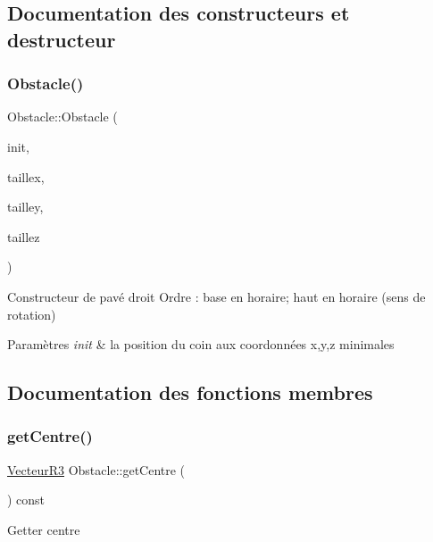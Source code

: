 \subsection{Documentation des constructeurs et destructeur}
\mbox{\label{class_obstacle_a72592db48f03233910c3c33145b96fd8}} 
\subsubsection{\texorpdfstring{Obstacle()}{Obstacle()}}
{\footnotesize\ttfamily Obstacle\+::\+Obstacle (\begin{DoxyParamCaption}\item[{\mbox{\hyperlink{class_vecteur_r3}{Vecteur\+R3}}}]{init,  }\item[{float}]{taillex,  }\item[{float}]{tailley,  }\item[{float}]{taillez }\end{DoxyParamCaption})}

Constructeur de pavé droit Ordre \+: base en horaire; haut en horaire (sens de rotation) 
\begin{DoxyParams}{Paramètres}
{\em init} & la position du coin aux coordonnées x,y,z minimales \\
\hline
\end{DoxyParams}


\subsection{Documentation des fonctions membres}
\mbox{\label{class_obstacle_a5f89117927ab1b5a3115f19ac21e0088}} 
\subsubsection{\texorpdfstring{get\+Centre()}{getCentre()}}
{\footnotesize\ttfamily \mbox{\hyperlink{class_vecteur_r3}{Vecteur\+R3}} Obstacle\+::get\+Centre (\begin{DoxyParamCaption}{ }\end{DoxyParamCaption}) const}

Getter centre \mbox{\label{class_obstacle_a03ada1e0aaa5825666010b60a840bed4}} 
